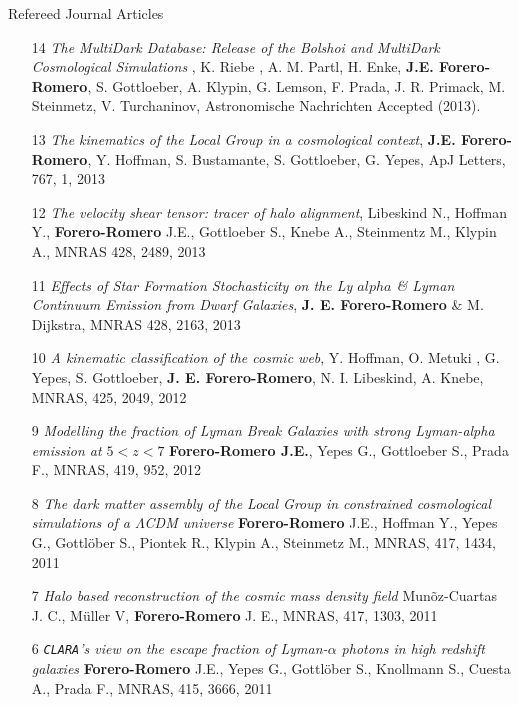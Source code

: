 \documentclass[9pt]{article}
\begin{document}
Refereed Journal Articles
\begin{enumerate}

\item[14]{\it The MultiDark Database: Release of the Bolshoi and MultiDark Cosmological Simulations} , K. Riebe , A. M. Partl, H. Enke, {\bf J.E. Forero-Romero}, S. Gottloeber, A. Klypin, G. Lemson, F. Prada, J. R. Primack, M. Steinmetz, V. Turchaninov, Astronomische Nachrichten Accepted (2013).



\item[13] {\it The kinematics of the Local Group in a cosmological context}, 
{\bf J.E. Forero-Romero}, Y. Hoffman, S. Bustamante, S. Gottloeber, G. Yepes, ApJ Letters, 767, 1, 2013


\item[12] {\it The velocity shear tensor: tracer of halo alignment}, Libeskind N., Hoffman Y., {\bf Forero-Romero} J.E., Gottloeber S., Knebe A., Steinmentz M., Klypin A., MNRAS 428, 2489, 2013

\item[11] {\it Effects of Star Formation Stochasticity on the Ly $alpha$ \& Lyman Continuum Emission from Dwarf Galaxies}, {\bf J. E. Forero-Romero} \& M. Dijkstra, MNRAS 428, 2163, 2013

\item[10] {\it A kinematic classification of the cosmic web}, Y. Hoffman, O. Metuki , G. Yepes, S. Gottloeber, {\bf J. E. Forero-Romero}, N. I. Libeskind, A. Knebe, MNRAS, 425, 2049, 2012

\item[9] {\it Modelling the fraction of Lyman Break Galaxies with strong Lyman-alpha emission at $5 < z < 7$} {\bf Forero-Romero J.E.}, Yepes G., Gottloeber S., Prada F., MNRAS, 419, 952, 2012

\item [8]
{\it The dark matter assembly of the Local Group in constrained cosmological
  simulations of a $\Lambda$CDM universe} {\bf Forero-Romero} J.E., Hoffman Y., Yepes G., Gottl\"ober S.,
  Piontek R., Klypin A., Steinmetz M., 
MNRAS, 417, 1434, 2011

\item[7] 
{\it Halo based reconstruction of the cosmic mass density field}
Mun\~oz-Cuartas J. C., M\"uller V, {\bf Forero-Romero} J. E.,
MNRAS, 417, 1303, 2011

\item [6]
{\it {\tt CLARA}'s view on the escape fraction of Lyman-$\alpha$ photons in
  high redshift galaxies}
{\bf Forero-Romero} J.E., Yepes G., Gottl\"ober S., Knollmann S., Cuesta A., Prada F.,  
MNRAS, 415, 3666, 2011


\end{enumerate}
\end{document}

